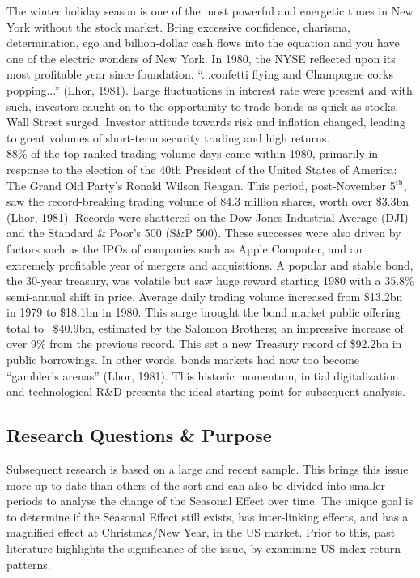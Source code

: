 \documentclass[11pt, english]{article}
\begin{document}
	The winter holiday season is one of the most powerful and energetic times in New York without the stock market. Bring excessive confidence, charisma, determination, ego and billion-dollar cash flows into the equation and you have one of the electric wonders of New York. In 1980, the NYSE reflected upon its most profitable year since foundation. ``...confetti flying and Champagne corks popping...'' (Lhor, 1981). Large fluctuations in interest rate were present and with such, investors caught-on to the opportunity to trade bonds as quick as stocks. Wall Street surged. Investor attitude towards risk and inflation changed, leading to great volumes of short-term security trading and high returns.\\

	88\% of the top-ranked trading-volume-days came within 1980, primarily in response to the election of the 40th President of the United States of America: The Grand Old Party’s Ronald Wilson Reagan. This period, post-November 5$\mathrm{^{th}}$, saw the record-breaking trading volume of 84.3 million shares, worth over \$3.3bn (Lhor, 1981). Records were shattered on the Dow Jones Industrial Average (DJI) and the Standard \& Poor's 500 (S\&P 500). These successes were also driven by factors such as the IPOs of companies such as Apple Computer, and an extremely profitable year of mergers and acquisitions. A popular and stable bond, the 30-year treasury, was volatile but saw huge reward starting 1980 with a 35.8\% semi-annual shift in price. Average daily trading volume increased from \$13.2bn in 1979 to \$18.1bn in 1980. This surge brought the bond market public offering total to ~\$40.9bn, estimated by the Salomon Brothers; an impressive increase of over 9\% from the previous record. This set a new Treasury record of \$92.2bn in public borrowings. In other words, bonds markets had now too become ``gambler's arenas'' (Lhor, 1981). This historic momentum, initial digitalization and technological R\&D presents the ideal starting point for subsequent analysis.

	\newpage

	\subsection{Research Questions \& Purpose} 

	Subsequent research is based on a large and recent sample. This brings this issue more up to date than others of the sort and can also be divided into smaller periods to analyse the change of the Seasonal Effect over time. The unique goal is to determine if the Seasonal Effect still exists, has inter-linking effects, and has a magnified effect at Christmas/New Year, in the US market. Prior to this, past literature highlights the significance of the issue, by examining US index return patterns.\\
\end{document}
